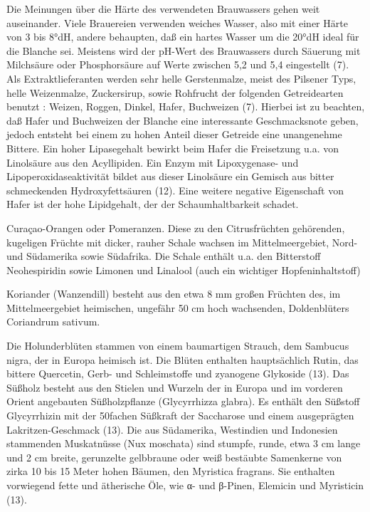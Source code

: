 \documentclass[a4paper,parskip=half]{scrartcl}
\begin{document}
Die Meinungen über die Härte des verwendeten Brauwassers gehen weit
auseinander. Viele Brauereien verwenden weiches Wasser, also mit einer Härte von
3 bis 8°dH, andere behaupten, daß ein hartes Wasser um die 20°dH ideal für die
Blanche sei. Meistens wird der pH-Wert des Brauwassers durch Säuerung mit
Milchsäure oder Phosphorsäure auf Werte zwischen 5,2 und 5,4 eingestellt (7).
Als Extraktlieferanten werden sehr helle Gerstenmalze, meist des Pilsener Typs,
helle Weizenmalze, Zuckersirup, sowie Rohfrucht der folgenden Getreidearten
benutzt : Weizen, Roggen, Dinkel, Hafer, Buchweizen (7).
Hierbei ist zu beachten, daß Hafer und Buchweizen der Blanche eine interessante
Geschmacksnote geben, jedoch entsteht bei einem zu hohen Anteil dieser Getreide
eine unangenehme Bittere. Ein hoher Lipasegehalt bewirkt beim Hafer die
Freisetzung u.a. von Linolsäure aus den Acyllipiden. Ein Enzym mit Lipoxygenase-
und Lipoperoxidaseaktivität bildet aus dieser Linolsäure ein Gemisch aus bitter
schmeckenden Hydroxyfettsäuren (12). Eine weitere negative Eigenschaft von Hafer
ist der hohe Lipidgehalt, der der Schaumhaltbarkeit schadet.

\parencite[15]{Strottner1999}

Curaçao-Orangen oder Pomeranzen. Diese zu den Citrusfrüchten gehörenden,
kugeligen Früchte mit dicker, rauher Schale wachsen im Mittelmeergebiet, Nord- und
Südamerika sowie Südafrika. Die Schale enthält u.a. den Bitterstoff Neohespiridin
sowie Limonen und Linalool (auch ein wichtiger Hopfeninhaltstoff)

Koriander (Wanzendill) besteht aus den etwa 8 mm großen Früchten des, im
Mittelmeergebiet heimischen, ungefähr 50 cm hoch wachsenden, Doldenblüters
Coriandrum sativum.

Die Holunderblüten stammen von einem baumartigen Strauch, dem Sambucus nigra,
der in Europa heimisch ist. Die Blüten enthalten hauptsächlich Rutin, das bittere
Quercetin, Gerb- und Schleimstoffe und zyanogene Glykoside (13).
Das Süßholz besteht aus den Stielen und Wurzeln der in Europa und im vorderen
Orient angebauten Süßholzpflanze (Glycyrrhizza glabra). Es enthält den Süßstoff
Glycyrrhizin mit der 50fachen Süßkraft der Saccharose und einem ausgeprägten
Lakritzen-Geschmack (13).
Die aus Südamerika, Westindien und Indonesien stammenden Muskatnüsse (Nux
moschata) sind stumpfe, runde, etwa 3 cm lange und 2 cm breite, gerunzelte
gelbbraune oder weiß bestäubte Samenkerne von zirka 10 bis 15 Meter hohen
Bäumen, den Myristica fragrans. Sie enthalten vorwiegend fette und ätherische Öle,
wie α- und β-Pinen, Elemicin und Myristicin (13).
\end{document}
